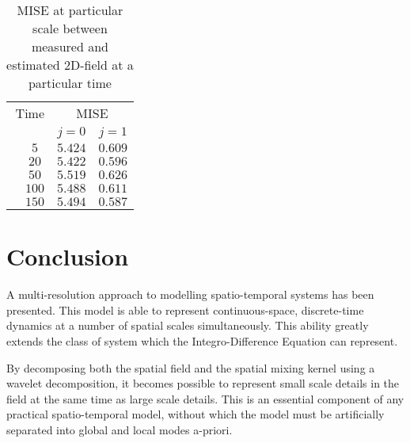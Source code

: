 \documentclass[journal,a4paper]{IEEEtran}
\begin{document}
{{%
\begin{table}[!h]
\renewcommand{\arraystretch}{1.3}
\caption {MISE  at particular scale between measured and estimated 2D-field  at a particular time}
\label{table:ValidationResultField}
\centering
\begin{tabular}{cccc}
\hline \hline
\multicolumn{2}{r}{Time}&\multicolumn{2}{c}{MISE} \\
\cline{3-4}
&&$j=0$&$j=1$ \\ 
\hline 
&$5$ &$5.424$&$0.609$ \\
&$20$ &$5.422$&$0.596$ \\
&$50$ &$5.519$&$0.626$ \\
&$100$ &$5.488$&$0.611$ \\
&$150$ &$5.494$&$0.587$ \\
\hline \hline
\end{tabular}
\end {table}
\section{Conclusion}
A multi-resolution approach to modelling spatio-temporal systems has been presented. This model is able to represent continuous-space, discrete-time dynamics at a number of spatial scales simultaneously. This ability greatly extends the class of system which the Integro-Difference Equation can represent.


By decomposing both the spatial field and the spatial mixing kernel using a wavelet decomposition, it becomes possible to represent small scale details in the field at the same time as large scale details. This is an essential component of any practical spatio-temporal model, without which the model must be artificially separated into global and local modes a-priori.


}}
\end{document}
